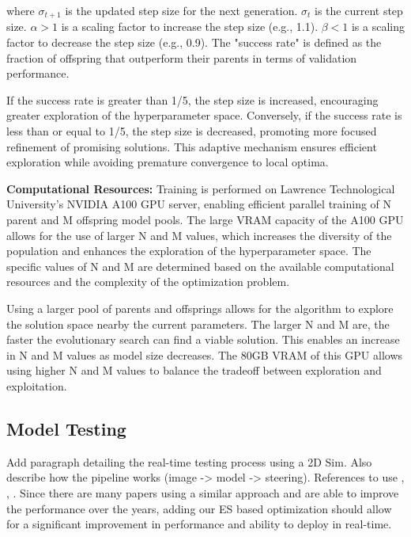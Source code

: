 \documentclass[conference]{IEEEtran}
\begin{document}
\begin{enumerate}
          where \(\sigma_{t+1}\) is the updated step size for the next generation. \(\sigma_t\) is the current step size. \(\alpha > 1\) is a scaling factor to increase the step size (e.g., 1.1). \(\beta < 1\) is a scaling factor to decrease the step size (e.g., 0.9). The "success rate" is defined as the fraction of offspring that outperform their parents in terms of validation performance.

          If the success rate is greater than 1/5, the step size is increased, encouraging greater exploration of the hyperparameter space. Conversely, if the success rate is less than or equal to 1/5, the step size is decreased, promoting more focused refinement of promising solutions. This adaptive mechanism ensures efficient exploration while avoiding premature convergence to local optima.

\end{enumerate}

\textbf{Computational Resources: } Training is performed on Lawrence Technological University's NVIDIA A100 GPU server, enabling efficient parallel training of N parent and M offspring model pools. The large VRAM capacity of the A100 GPU allows for the use of larger N and M values, which increases the diversity of the population and enhances the exploration of the hyperparameter space. The specific values of N and M are determined based on the available computational resources and the complexity of the optimization problem.

Using a larger pool of parents and offsprings allows for the algorithm to explore the solution space nearby the current parameters. The larger N and M are, the faster the evolutionary search can find a viable solution. This enables an increase in N and M values as model size decreases. The 80GB VRAM of this GPU allows using higher N and M values to balance the tradeoff between exploration and exploitation.

\subsection{Model Testing}
Add paragraph detailing the real-time testing process using a 2D Sim. Also describe how the pipeline works (image -> model -> steering). References to use \cite{CNN_can_self_drive}, \cite{lane_detection_good_results_zigzag}, \cite{KITTI_dataset}. Since there are many papers using a similar approach and are able to improve the performance over the years, adding our ES based optimization should allow for a significant improvement in performance and ability to deploy in real-time.
\end{document}
